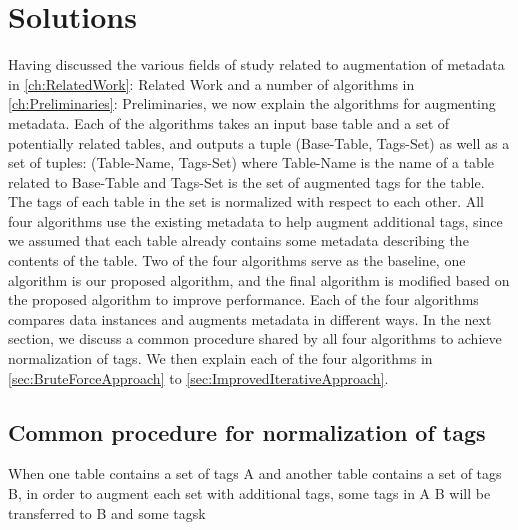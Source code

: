 
\chapter{Solutions}
\label{ch:Solutions}

Having discussed the various fields of study related to augmentation of metadata in \autoref{ch:RelatedWork}: Related Work and a number of algorithms in \autoref{ch:Preliminaries}: Preliminaries, we now explain the algorithms for augmenting metadata. Each of the algorithms takes an input base table and a set of potentially related tables, and outputs a tuple (Base-Table, Tags-Set) as well as a set of tuples:
(Table-Name, Tags-Set)
where Table-Name is the name of a table related to Base-Table and Tags-Set is the set of augmented tags for the table. The tags of each table in the set is normalized with respect to each other.
All four algorithms use the existing metadata to help augment additional tags, since we assumed that each table already contains some metadata describing the contents of the table. Two of the four algorithms serve as the baseline, one algorithm is our proposed algorithm, and the final algorithm is modified based on the proposed algorithm to improve performance. Each of the four algorithms compares data instances and augments metadata in different ways. In the next section, we discuss a common procedure shared by all four algorithms to achieve normalization of tags. We then explain each of the four algorithms in \autoref{sec:BruteForceApproach} to \autoref{sec:ImprovedIterativeApproach}.

\section{Common procedure for normalization of tags}
\label{sec:CommonProcedureForNormalizationOfTags}

When one table contains a set of tags A and another table contains a set of tags B, in order to augment each set with additional tags, some tags in A  B will be transferred to B and some tagsk

